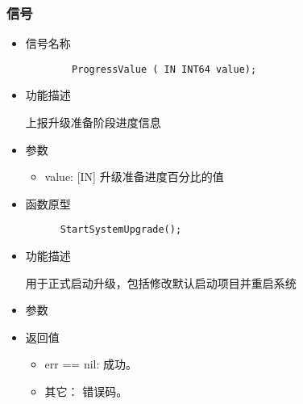\documentclass{utart}
\begin{document}
\subsubsection{信号}
\begin{itemize}
    \item 信号名称
    
    \begin{verbatim}
        ProgressValue ( IN INT64 value);
      \end{verbatim}

    \item 功能描述
    
    上报升级准备阶段进度信息
    \item 参数
        \begin{itemize}
            \item value: [IN] 升级准备进度百分比的值
        \end{itemize}
\end{itemize}

\begin{itemize}
  \item 函数原型
  
  \begin{verbatim}
      StartSystemUpgrade();
    \end{verbatim}
  \item 功能描述
  
  用于正式启动升级，包括修改默认启动项目并重启系统
  \item 参数
    \begin{itemize}
    \end{itemize}
  \item 返回值
    \begin{itemize}
        \item err == nil: 成功。
        \item 其它： 错误码。
    \end{itemize}
\end{itemize}
\end{document}
